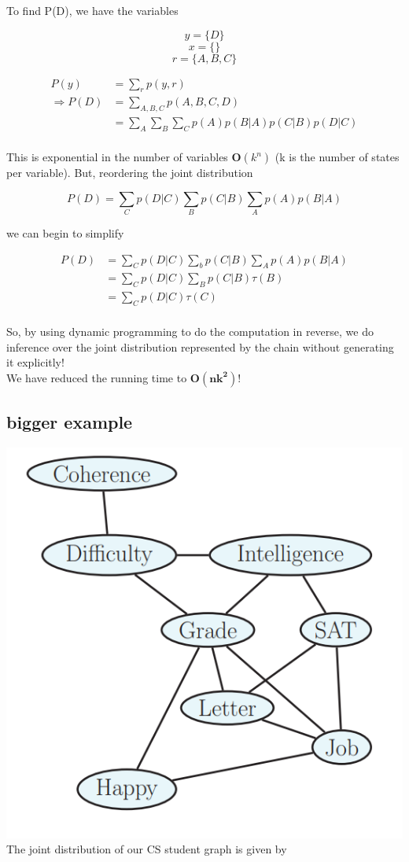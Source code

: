 \documentclass{article}
\begin{document}
To find P(D), we have the variables

$$y = \{D\}$$
$$x = \{\}$$
$$r = \{A, B, C\} $$

\begin{align*} 
P(y) &= \sum_{r} p(y, r) \\ 
\Rightarrow P(D) &= \sum_{A, B, C}p(A, B, C, D) \\ 
& = \sum_A \sum_B \sum_C p(A)p(B | A) p(C | B) p(D | C) \\
\end{align*}

This is exponential in the number of variables $\mathbf O(k^n)$ (k is the number of states per variable). But, reordering the joint distribution

$$ P(D) = \sum_C p(D | C) \sum_B p(C | B) \sum_A p(A)p(B | A) $$

we can begin to simplify

\begin{align*} 
P(D) &= \sum_C p(D | C) \sum_b p(C | B) \sum_A p(A)p(B | A) \\
&= \sum_C p(D | C) \sum_B p(C | B) \tau (B) \\
&= \sum_C p(D | C) \tau (C) \\
\end{align*}

So, by using dynamic programming to do the computation in reverse, we do inference over the joint distribution represented by the chain without generating it explicitly!\\
We have reduced the running time to $\mathbf{O(nk^2)}$!

\subsection{bigger example}

\includegraphics[scale=0.7]{Screenshot_12.png}\\
The joint distribution of our CS student graph is given by
\end{document}
